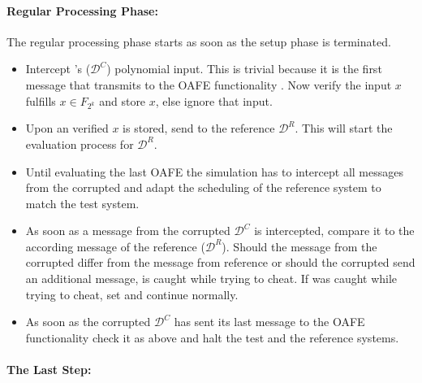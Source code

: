 \paragraph{Regular Processing Phase:}

The regular processing phase starts as soon as the setup phase is terminated.

\begin{itemize}

  \item Intercept \JWpTwo{}'s ($\mathcal{D}^C$) polynomial input. This is
    trivial because it is the first message that \JWpTwo{} transmits to the OAFE
    functionality \JWfuncSymOAFE{}. Now verify the input $x$ fulfills $x \in
    F_{2^k}$ and store $x$, else ignore that input.

  \item Upon an verified $x$ is stored, send  to the
    reference \JWpTwo{} $\mathcal{D}^R$. This will start the evaluation process
    for $\mathcal{D}^R$.

  \item Until evaluating the last OAFE the simulation has to intercept all
    messages from the corrupted \JWpTwo{} and adapt the scheduling of the
    reference system to match the test system.

  \item As soon as a message from the corrupted \JWpTwo{} $\mathcal{D}^C$ is
    intercepted, compare it to the according message of the reference \JWpTwo{}
    ($\mathcal{D}^R$). Should the message from the corrupted \JWpTwo{} differ
    from the message from reference \JWpTwo{} or should the corrupted \JWpTwo{}
    send an additional message, \JWpTwo{} is caught while trying to cheat. If
    \JWpTwo{} was caught while trying to cheat, set  and continue normally.

  \item As soon as the corrupted $\mathcal{D}^C$ has sent its last message to
    the OAFE functionality check it as above and halt the test and the reference
    systems.

\end{itemize}

\paragraph{The Last Step:}

